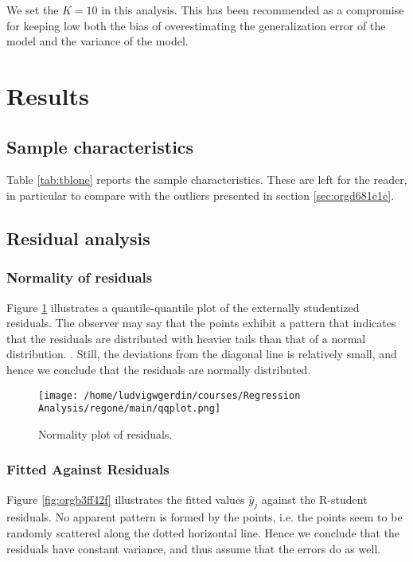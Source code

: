 \documentclass[11pt]{article}
\begin{document}
We set the \(K = 10\) in this analysis. This has been recommended as a compromise for keeping low both the bias of 
overestimating the generalization error of the model and the variance of the model.
\cite{hastie2009elements}

\newpage
\section{Results}
\label{sec:orgb27c0e4}
\subsection{Sample characteristics}
\label{sec:org9f0c0b3}

Table \ref{tab:tblone} reports the sample characteristics. These are left for the reader, in particular to
compare with the outliers presented in section \ref{sec:orgd681e1e}.



\subsection{Residual analysis}
\label{sec:org5a86970}
\subsubsection{Normality of residuals}
\label{sec:org8e0be33}

Figure \ref{fig:org524f46d} illustrates a quantile-quantile plot of the externally studentized residuals.
The observer may say that the points exhibit a pattern that indicates that the residuals are distributed with
heavier tails than that of a normal distribution. \cite{Montgomery2012}. Still, the deviations from the
diagonal line is relatively small, and hence we conclude that the residuals are normally distributed.

\begin{figure}[htbp]
\centering
\texttt{[image: /home/ludvigwgerdin/courses/Regression Analysis/regone/main/qqplot.png]}
\caption{\label{fig:org524f46d}
Normality plot of residuals.}
\end{figure}

\subsubsection{Fitted Against Residuals}
\label{sec:orge869c9f}

Figure \ref{fig:orgb3ff42f} illustrates the fitted values \(\hat y_j\) against the R-student residuals. No apparent 
pattern is formed by the points, i.e. the points seem to be randomly scattered along the dotted horizontal
line. Hence we conclude that the residuals have constant variance, and thus assume that the errors do
as well.
\end{document}
